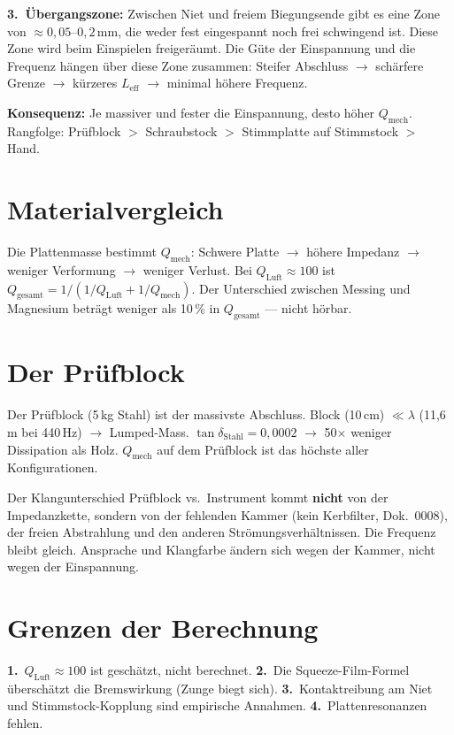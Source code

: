 \documentclass[11pt,a4paper]{article}
\begin{document}
\textbf{3.\ Übergangszone:} Zwischen Niet und freiem Biegungsende gibt es eine Zone von $\approx 0{,}05$--$0{,}2$\,mm, die weder fest eingespannt noch frei schwingend ist. Diese Zone wird beim Einspielen freigeräumt. Die Güte der Einspannung und die Frequenz hängen über diese Zone zusammen: Steifer Abschluss $\to$ schärfere Grenze $\to$ kürzeres $L_\text{eff}$ $\to$ minimal höhere Frequenz.

\begin{keybox}
\textbf{Konsequenz:} Je massiver und fester die Einspannung, desto höher $Q_\text{mech}$. Rangfolge: Prüfblock $>$ Schraubstock $>$ Stimmplatte auf Stimmstock $>$ Hand.
\end{keybox}

\section{Materialvergleich}

Die Plattenmasse bestimmt $Q_\text{mech}$: Schwere Platte $\to$ höhere Impedanz $\to$ weniger Verformung $\to$ weniger Verlust. Bei $Q_\text{Luft} \approx 100$ ist $Q_\text{gesamt} = 1/(1/Q_\text{Luft} + 1/Q_\text{mech})$. Der Unterschied zwischen Messing und Magnesium beträgt weniger als 10\,\% in $Q_\text{gesamt}$ --- nicht hörbar.

\section{Der Prüfblock}

Der Prüfblock (5\,kg Stahl) ist der massivste Abschluss. Block (10\,cm) $\ll \lambda$ (11,6\,m bei 440\,Hz) $\to$ Lumped-Mass. $\tan\delta_\text{Stahl} = 0{,}0002$ $\to$ 50$\times$ weniger Dissipation als Holz. $Q_\text{mech}$ auf dem Prüfblock ist das höchste aller Konfigurationen.

Der Klangunterschied Prüfblock vs.\ Instrument kommt \textbf{nicht} von der Impedanzkette, sondern von der fehlenden Kammer (kein Kerbfilter, Dok.~0008), der freien Abstrahlung und den anderen Strömungsverhältnissen. Die Frequenz bleibt gleich. Ansprache und Klangfarbe ändern sich wegen der Kammer, nicht wegen der Einspannung.

\section{Grenzen der Berechnung}

\textbf{1.}~$Q_\text{Luft} \approx 100$ ist geschätzt, nicht berechnet. \textbf{2.}~Die Squeeze-Film-Formel überschätzt die Bremswirkung (Zunge biegt sich). \textbf{3.}~Kontaktreibung am Niet und Stimmstock-Kopplung sind empirische Annahmen. \textbf{4.}~Plattenresonanzen fehlen.
\end{document}
